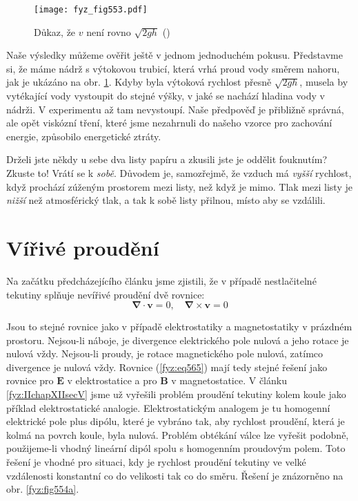     \begin{figure}[ht!] %
      \centering
      \texttt{[image: fyz\_fig553.pdf]}
      \caption{Důkaz, že \(v\) není rovno \(\sqrt{2gh}\)
               (\cite[s.~751]{Feynman02})}
      \label{fyz:fig553}
    \end{figure}
    
    Naše výsledky můžeme ověřit ještě v jednom jednoduchém pokusu. Představme si, že máme nádrž s 
    výtokovou trubicí, která vrhá proud vody směrem nahoru, jak je ukázáno na obr. 
    \ref{fyz:fig553}. Kdyby byla výtoková rychlost přesně \(\sqrt{2gh}\), musela by vytékající vody 
    vystoupit do stejné výšky, v jaké se nachází hladina vody v nádrži. V experimentu až tam 
    nevystoupí. Naše předpověď je přibližně správná, ale opět viskózní tření, které jsme nezahrnuli 
    do našeho vzorce pro zachování energie, způsobilo energetické ztráty.
    
    Drželi jste někdy u sebe dva listy papíru a zkusili jste je oddělit fouknutím? Zkuste to! Vrátí 
    se k \emph{sobě}. Důvodem je, samozřejmě, že vzduch má \emph{vyšší} rychlost, když prochází 
    zúženým prostorem mezi listy, než když je mimo. Tlak mezi listy je \emph{nižší} než 
    atmosférický tlak, a tak k sobě listy přilnou, místo aby se vzdálili.
    
  \section{Vířivé proudění}\label{fyz:IIchapXLsecIV}
    Na začátku předcházejícího článku jsme zjistili, že v případě nestlačitelné tekutiny splňuje 
    nevířivé proudění dvě rovnice:
    \begin{equation}\label{fyz:eq565}
      \symbf{\nabla}\cdot\bm{v} = 0, \quad \symbf{\nabla}\times\bm{v} = 0
    \end{equation}
    
    Jsou to stejné rovnice jako v případě elektrostatiky a magnetostatiky v prázdném prostoru. 
    Nejsou-li náboje, je divergence elektrického pole nulová a jeho rotace je nulová vždy. 
    Nejsou-li proudy, je rotace magnetického pole nulová, zatímco divergence je nulová vždy. 
    Rovnice (\ref{fyz:eq565}) mají tedy stejné řešení jako rovnice pro \(\bm{E}\) v elektrostatice 
    a pro \(\bm{B}\) v magnetostatice. V článku \ref{fyz:IIchapXIIsecV} jsme už vyřešili problém 
    proudění tekutiny kolem koule jako příklad elektrostatické analogie. Elektrostatickým analogem 
    je tu homogenní elektrické pole plus dipólu, které je vybráno tak, aby rychlost proudění, která 
    je kolmá na povrch koule, byla nulová. Problém obtékání válce lze vyřešit podobně, použijeme-li 
    vhodný lineární dipól spolu s homogenním proudovým polem. Toto řešení je vhodné pro situaci, 
    kdy je rychlost proudění tekutiny ve velké vzdálenosti konstantní co do velikosti tak co do 
    směru. Řešení je znázorněno na obr. \ref{fyz:fig554a}.
    

